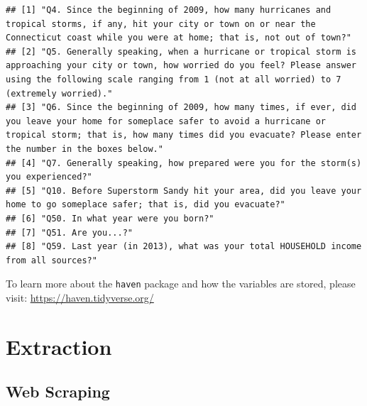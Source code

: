 \documentclass[
]{book}
\begin{document}
\begin{verbatim}
## [1] "Q4. Since the beginning of 2009, how many hurricanes and tropical storms, if any, hit your city or town on or near the Connecticut coast while you were at home; that is, not out of town?"                                         
## [2] "Q5. Generally speaking, when a hurricane or tropical storm is approaching your city or town, how worried do you feel? Please answer using the following scale ranging from 1 (not at all worried) to 7 (extremely worried)."        
## [3] "Q6. Since the beginning of 2009, how many times, if ever, did you leave your home for someplace safer to avoid a hurricane or tropical storm; that is, how many times did you evacuate? Please enter the number in the boxes below."
## [4] "Q7. Generally speaking, how prepared were you for the storm(s) you experienced?"                                                                                                                                                    
## [5] "Q10. Before Superstorm Sandy hit your area, did you leave your home to go someplace safer; that is, did you evacuate?"                                                                                                              
## [6] "Q50. In what year were you born?"                                                                                                                                                                                                   
## [7] "Q51. Are you...?"                                                                                                                                                                                                                   
## [8] "Q59. Last year (in 2013), what was your total HOUSEHOLD income from all sources?"
\end{verbatim}

To learn more about the \texttt{haven} package and how the variables are stored, please visit: \url{https://haven.tidyverse.org/}

\hypertarget{extraction}{%
\chapter{Extraction}\label{extraction}}

\hypertarget{web-scraping}{%
\section{Web Scraping}\label{web-scraping}}
\end{document}
